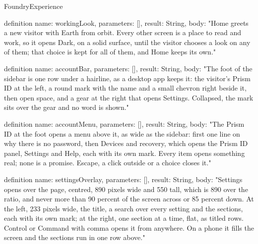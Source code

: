 \begin{lexlean}{FoundryExperience}
\begin{semanticmodule}
definition{
  name: workingLook,
  parameters: [],
  result: String,
  body: "Home greets a new visitor with Earth from orbit. Every other screen is a place to read and work, so it opens Dark, on a solid surface, until the visitor chooses a look on any of them; that choice is kept for all of them, and Home keeps its own."
}

definition{
  name: accountBar,
  parameters: [],
  result: String,
  body: "The foot of the sidebar is one row under a hairline, as a desktop app keeps it: the visitor's Prism ID at the left, a round mark with the name and a small chevron right beside it, then open space, and a gear at the right that opens Settings. Collapsed, the mark sits over the gear and no word is shown."
}

definition{
  name: accountMenu,
  parameters: [],
  result: String,
  body: "The Prism ID at the foot opens a menu above it, as wide as the sidebar: first one line on why there is no password, then Devices and recovery, which opens the Prism ID panel, Settings and Help, each with its own mark. Every item opens something real; none is a promise. Escape, a click outside or a choice closes it."
}

definition{
  name: settingsOverlay,
  parameters: [],
  result: String,
  body: "Settings opens over the page, centred, 890 pixels wide and 550 tall, which is 890 over the ratio, and never more than 90 percent of the screen across or 85 percent down. At the left, 233 pixels wide, the title, a search over every setting and the sections, each with its own mark; at the right, one section at a time, flat, as titled rows. Control or Command with comma opens it from anywhere. On a phone it fills the screen and the sections run in one row above."
}
\end{semanticmodule}
\end{lexlean}
